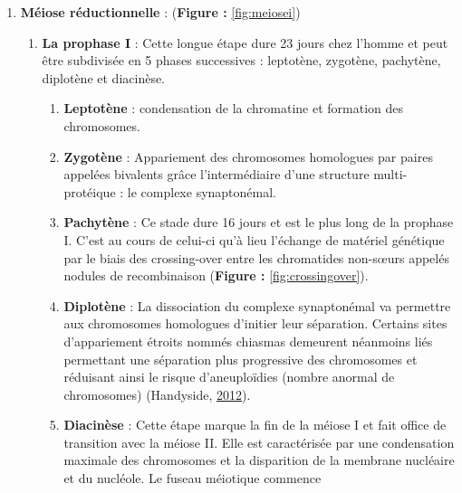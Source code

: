 \documentclass[12pt,twoside]{reedthesis}
\providecommand{\tightlist}{%
  \setlength{\itemsep}{0pt}\setlength{\parskip}{0pt}}
\theoremstyle{definition}
\theoremstyle{definition}
\theoremstyle{remark}
\begin{document}
  \newpage
  
  \begin{enumerate}
  \def\labelenumi{\arabic{enumi}.}
  \tightlist
  \item
    \textbf{Méiose réductionnelle} : (\textbf{Figure : }\ref{fig:meiosei})
  
    \begin{enumerate}
    \def\labelenumii{\alph{enumii}.}
    \item
      \textbf{La prophase I} : Cette longue étape dure 23 jours chez
      l'homme et peut être subdivisée en 5 phases successives : leptotène,
      zygotène, pachytène, diplotène et diacinèse.
  
      \begin{enumerate}
      \def\labelenumiii{\roman{enumiii}.}
      \tightlist
      \item
        \textbf{Leptotène} : condensation de la chromatine et formation
        des chromosomes.\\
      \item
        \textbf{Zygotène} : Appariement des chromosomes homologues par
        paires appelées bivalents grâce l'intermédiaire d'une structure
        multi-protéique : le complexe synaptonémal.\\
      \item
        \textbf{Pachytène} : Ce stade dure 16 jours et est le plus long de
        la prophase I. C'est au cours de celui-ci qu'à lieu l'échange de
        matériel génétique par le biais des crossing-over entre les
        chromatides non-sœurs appelés nodules de recombinaison
        (\textbf{Figure : }\ref{fig:crossingover}).\\
      \item
        \textbf{Diplotène} : La dissociation du complexe synaptonémal va
        permettre aux chromosomes homologues d'initier leur séparation.
        Certains sites d'appariement étroits nommés chiasmas demeurent
        néanmoins liés permettant une séparation plus progressive des
        chromosomes et réduisant ainsi le risque d'aneuploïdies (nombre
        anormal de chromosomes) (Handyside,
        \protect\hyperlink{ref-Handyside2012}{2012}).\\
      \item
        \textbf{Diacinèse} : Cette étape marque la fin de la méiose I et
        fait office de transition avec la méiose II. Elle est caractérisée
        par une condensation maximale des chromosomes et la disparition de
        la membrane nucléaire et du nucléole. Le fuseau méiotique commence

\end{enumerate}
\end{enumerate}
\end{enumerate}
\end{document}
